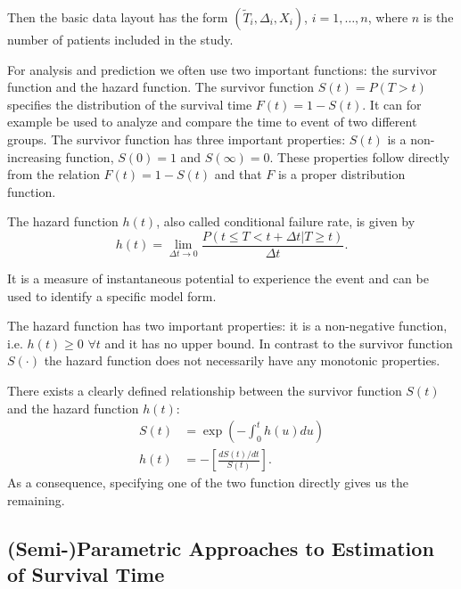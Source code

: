 \documentclass[12pt, a4paper]{scrartcl}
\theoremstyle{definition}
\theoremstyle{plain}
\numberwithin{equation}{section}
\numberwithin{figure}{section}
\numberwithin{table}{section}
\begin{document}
	Then the basic data layout has the form $(\tilde{T}_i, \Delta_i, X_i)$, $i = 1, \dots , n$, where $n$ is the number of patients included in the study.
	
	
	For analysis and prediction we often use two important functions: the survivor function and the hazard function.
	The survivor function $S(t) = P(T > t)$ specifies the distribution of the survival time $F(t) = 1 - S(t)$.
	It can for example be used to analyze and compare the time to event of two different groups.
	The survivor function has three important properties: $S(t)$ is a non-increasing function, $S(0)=1$ and $S(\infty)=0$.
	These properties follow directly from the relation $F(t)=1-S(t)$ and that $F$ is a proper distribution function.
	
	The hazard function $h(t)$, also called conditional failure rate, is given by
	\begin{equation*}
		h(t) = \lim_{\Delta t \to 0}\frac{P(t \leq T < t + \Delta t \vert T \geq t)}{\Delta t}.
	\end{equation*} 
	
	It is a measure of instantaneous potential to experience the event and can be used to identify a specific model form.
	
	The hazard function has two important properties: it is a non-negative function, i.e. $h(t) \geq 0$ $ \forall t$ and it has no upper bound.
	In contrast to the survivor function $S(\cdot)$ the hazard function does not necessarily have any monotonic properties.

	There exists a clearly defined relationship between the survivor function $S(t)$ and the hazard function $h(t)$:
	\begin{equation*}
	\begin{split}
		S(t) &= \exp \left( - \int_{0}^{t}h(u)du\right) \\
		h(t) & = - \left[ \frac{dS(t)/dt}{S(t)}\right].
	\end{split}
	\end{equation*}
	As a consequence, specifying one of the two function directly gives us the remaining.
	
	
	
	\subsection{(Semi-)Parametric Approaches to Estimation of Survival Time} \label{cox}
\end{document}
